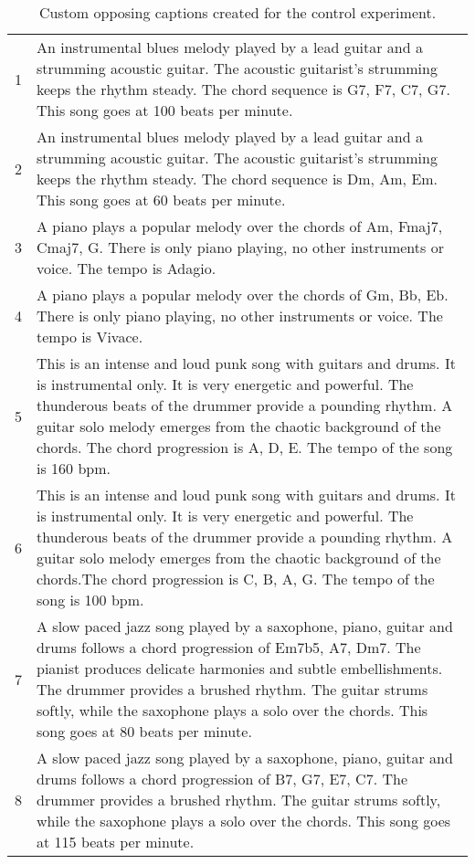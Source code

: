 \documentclass[11pt]{article}
\begin{document}
\begin{table*}[h]
\caption{Custom opposing captions created for the control experiment. }
\label{tab:controlprompts}
\footnotesize
\begin{tabular}{p{0.4cm} p{15cm}} 
\toprule
1 & An instrumental blues melody played by a lead guitar and a strumming acoustic guitar. The acoustic guitarist's strumming keeps the rhythm steady. The chord sequence is G7, F7, C7, G7. This song goes at 100 beats per minute.       \\ 
2 & An instrumental blues melody played by a lead guitar and a strumming acoustic guitar. The acoustic guitarist's strumming keeps the rhythm steady. The chord sequence is Dm, Am, Em. This song goes at 60 beats per minute.                   \\
3& A piano plays a popular melody over the chords of Am, Fmaj7, Cmaj7, G. There is only piano playing, no other instruments or voice. The tempo is Adagio.    \\
4& A piano plays a popular melody over the chords of Gm, Bb, Eb. There is only piano playing, no other instruments or voice. The tempo is Vivace.                                                                                                        \\
5& This is an intense and loud punk song with guitars and drums. It is instrumental only. It is very energetic and powerful. The thunderous beats of the drummer provide a pounding rhythm. A guitar solo melody emerges from the chaotic background of the chords. The chord progression is A, D, E. The tempo of the song is 160 bpm.           \\
6& This is an intense and loud punk song with guitars and drums. It is instrumental only. It is very energetic and powerful. The thunderous beats of the drummer provide a pounding rhythm. A guitar solo melody emerges from the chaotic background of the chords.The chord progression is C, B, A, G. The tempo of the song is 100 bpm.          \\
7& A slow paced jazz song played by a saxophone, piano, guitar and drums follows a chord progression of Em7b5, A7, Dm7. The pianist produces delicate harmonies and subtle embellishments. The drummer provides a brushed rhythm. The guitar strums softly, while the saxophone plays a solo over the chords. This song goes at 80 beats per minute.  \\
8& A slow paced jazz song played by a saxophone, piano, guitar and drums follows a chord progression of B7, G7, E7, C7. The drummer provides a brushed rhythm. The guitar strums softly, while the saxophone plays a solo over the chords. This song goes at 115 beats per minute.  \\

\end{tabular}
\end{table*}
\end{document}
